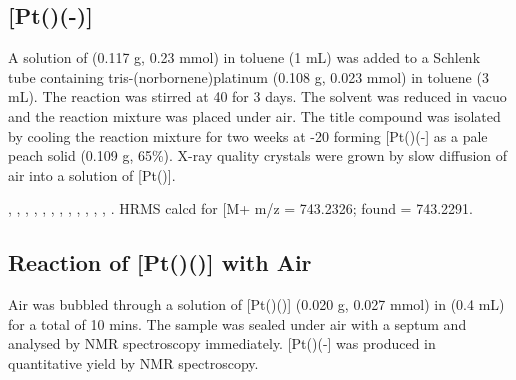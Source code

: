 \subsection*{\texorpdfstring{[Pt(\tButhixantphos)(-)]} P}


A solution of \tButhixantphos{} (0.117 g, 0.23 mmol) in toluene (1 mL) was added to a Schlenk tube containing tris-(norbornene)platinum (0.108 g, 0.023 mmol) in toluene (3 mL).  The reaction was stirred at 40 \degC{} for 3 days.  The solvent was reduced in vacuo and the reaction mixture was placed under air.  The title compound was isolated by cooling the reaction mixture for two weeks at -20 \degC{} forming [Pt(\tButhixantphos)(-] as a pale peach solid (0.109 g, 65\%).  X-ray quality crystals were grown by slow diffusion of air into a  solution of [Pt(\tButhixantphos)].

,
,
,
,
,
,
,
,
,
,
,
,
.
HRMS calcd for  [M+\ce{H]+} m/z = 743.2326; found = 743.2291.

\subsection*{Reaction of \texorpdfstring{[Pt(\tButhixantphos)()]} P with Air}
Air was bubbled through a solution of [Pt(\tButhixantphos)()] (0.020 g, 0.027 mmol) in  (0.4 mL) for a total of 10 mins.  The sample was sealed under air with a septum and analysed by NMR spectroscopy immediately.  [Pt(\tButhixantphos)(-] was produced in quantitative yield by NMR spectroscopy.  

